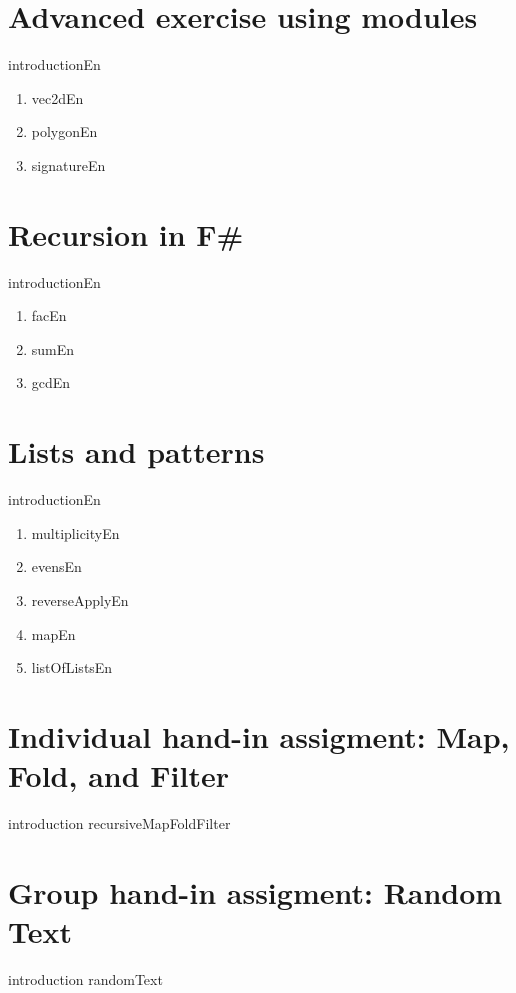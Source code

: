\documentclass[a4paper,12pt]{article}
\begin{document}
\section{Advanced exercise using modules}
{introductionEn}
\begin{enumerate}
\item {vec2dEn}
\item {polygonEn}
\item {signatureEn}
\end{enumerate}
\section{Recursion in F\#}
{introductionEn}
\begin{enumerate}
\item {facEn}
\item {sumEn}
\item {gcdEn}
\end{enumerate}
\section{Lists and patterns}
{introductionEn}
\begin{enumerate}
\item {multiplicityEn}
\item {evensEn}
\item {reverseApplyEn}
\item {mapEn}
\item {listOfListsEn}
\end{enumerate}

\section{Individual hand-in assigment: Map, Fold, and Filter}
{introduction}
{recursiveMapFoldFilter}

\section{Group hand-in assigment: Random Text}
{introduction}
{randomText}
\end{document}
